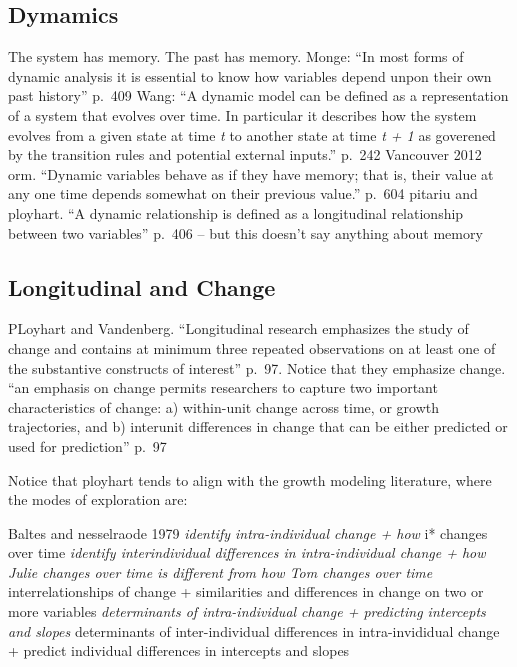 \documentclass[english,,man]{apa6}
\theoremstyle{definition}
\theoremstyle{definition}
\theoremstyle{definition}
\theoremstyle{remark}
\begin{document}
\hypertarget{dymamics}{%
\subsection{Dymamics}\label{dymamics}}

The system has memory. The past has memory. Monge: \enquote{In most
forms of dynamic analysis it is essential to know how variables depend
unpon their own past history} p.~409 Wang: \enquote{A dynamic model can
be defined as a representation of a system that evolves over time. In
particular it describes how the system evolves from a given state at
time \emph{t} to another state at time \emph{t + 1} as goverened by the
transition rules and potential external inputs.} p.~242 Vancouver 2012
orm. \enquote{Dynamic variables behave as if they have memory; that is,
their value at any one time depends somewhat on their previous value.}
p.~604 pitariu and ployhart. \enquote{A dynamic relationship is defined
as a longitudinal relationship between two variables} p.~406 -- but this
doesn't say anything about memory

\hypertarget{longitudinal-and-change}{%
\subsection{Longitudinal and Change}\label{longitudinal-and-change}}

PLoyhart and Vandenberg. \enquote{Longitudinal research emphasizes the
study of change and contains at minimum three repeated observations on
at least one of the substantive constructs of interest} p.~97. Notice
that they emphasize change. \enquote{an emphasis on change permits
researchers to capture two important characteristics of change: a)
within-unit change across time, or growth trajectories, and b) interunit
differences in change that can be either predicted or used for
prediction} p.~97

Notice that ployhart tends to align with the growth modeling literature,
where the modes of exploration are:

Baltes and nesselraode 1979 \emph{identify intra-individual change + how
}i* changes over time \emph{identify interindividual differences in
intra-individual change + how Julie changes over time is different from
how Tom changes over time }interrelationships of change + similarities
and differences in change on two or more variables \emph{determinants of
intra-individual change + predicting intercepts and slopes }determinants
of inter-individual differences in intra-invididual change + predict
individual differences in intercepts and slopes
\end{document}
